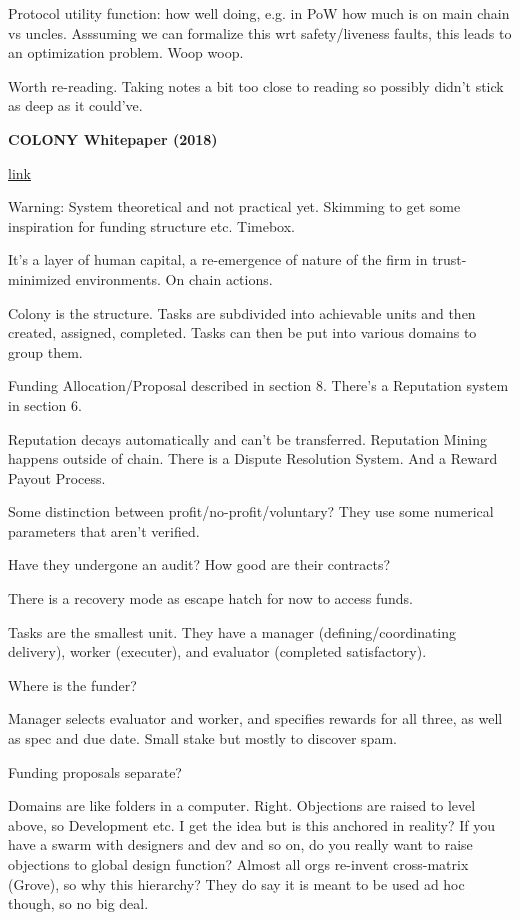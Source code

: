 \documentclass[12pt]{report}
\newcommand{\link}[2]{\href{#1}{#2}}
\begin{document}
Protocol utility function: how well doing, e.g. in PoW how much is on main chain
vs uncles. Asssuming we can formalize this wrt safety/liveness faults, this
leads to an optimization problem. Woop woop.

Worth re-reading. Taking notes a bit too close to reading so possibly didn't
stick as deep as it could've.

\textbf{COLONY Whitepaper (2018)}

\link{https://colony.io/whitepaper.pdf}{link}

Warning: System theoretical and not practical yet. Skimming to get some
inspiration for funding structure etc. Timebox.

It's a layer of human capital, a re-emergence of nature of the firm in
trust-minimized environments. On chain actions.

Colony is the structure. Tasks are subdivided into achievable units and then
created, assigned, completed. Tasks can then be put into various domains to
group them.

Funding Allocation/Proposal described in section 8. There's a Reputation system
in section 6.

Reputation decays automatically and can't be transferred. Reputation Mining
happens outside of chain. There is a Dispute Resolution System. And a Reward
Payout Process.

Some distinction between profit/no-profit/voluntary? They use some numerical
parameters that aren't verified.

Have they undergone an audit? How good are their contracts?

There is a recovery mode as escape hatch for now to access funds.

Tasks are the smallest unit. They have a manager (defining/coordinating
delivery), worker (executer), and evaluator (completed satisfactory).

Where is the funder?

Manager selects evaluator and worker, and specifies rewards for all three, as
well as spec and due date. Small stake but mostly to discover spam.

Funding proposals separate?

Domains are like folders in a computer. Right. Objections are raised to level
above, so Development etc. I get the idea but is this anchored in reality? If
you have a swarm with designers and dev and so on, do you really want to raise
objections to global design function? Almost all orgs re-invent cross-matrix
(Grove), so why this hierarchy? They do say it is meant to be used ad hoc
though, so no big deal.
\end{document}
